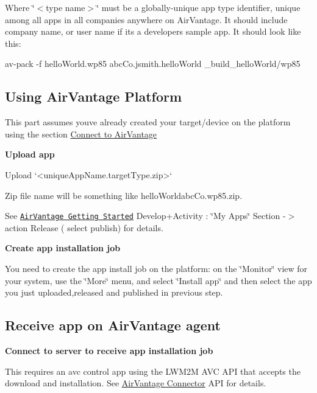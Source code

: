 Where \char`\"{}$<$type name$>$\char`\"{} must be a globally-\/unique app type identifier, unique among all apps in all companies anywhere on Air\+Vantage. It should include company name, or user name if it\textquotesingle{}s a developer\textquotesingle{}s sample app. It should look like this\+:

\begin{DoxyVerb} av-pack -f helloWorld.wp85 abcCo.jsmith.helloWorld _build_helloWorld/wp85
\end{DoxyVerb}
\hypertarget{how_to_a_v_install_app_appInstallAirVantage_usingAv}{}\subsection{Using Air\+Vantage Platform}\label{how_to_a_v_install_app_appInstallAirVantage_usingAv}
This part assumes you\textquotesingle{}ve already created your target/device on the platform using the section \hyperlink{connecting_air_vantage}{Connect to Air\+Vantage}

{\bfseries Upload app}

\begin{DoxyVerb}Upload `<uniqueAppName.targetType.zip>`
\end{DoxyVerb}


Zip file name will be something like {\ttfamily hello\+Worldabc\+Co.\+wp85.\+zip}.

See \href{https://doc.airvantage.net/display/USERGUIDE/Getting+Started}{\tt Air\+Vantage Getting Started} Develop+\+Activity \+: \char`\"{}\+My
\+Apps\char`\"{} Section -\/$>$ action Release ( select publish) for details.

{\bfseries Create app installation job}

You need to create the app install job on the platform\+: on the \char`\"{}\+Monitor\char`\"{} view for your system, use the \char`\"{}\+More\char`\"{} menu, and select \char`\"{}\+Install app\char`\"{} and then select the app you just uploaded,released and published in previous step.\hypertarget{how_to_a_v_install_app_appInstallAirVantage_rcvAppAgent}{}\subsection{Receive app on Air\+Vantage agent}\label{how_to_a_v_install_app_appInstallAirVantage_rcvAppAgent}
{\bfseries Connect to server to receive app installation job}

This requires an {\ttfamily avc} control app using the L\+W\+M2\+M A\+V\+C A\+P\+I that accepts the download and installation. See \hyperlink{c_le_avc}{Air\+Vantage Connector} A\+P\+I for details.

